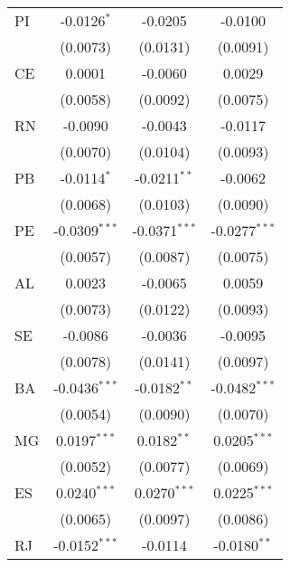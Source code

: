 \begin{tabular}{lccc}
   PI              & -0.0126$^{*}$           & -0.0205                 & -0.0100\\   
                   & (0.0073)                & (0.0131)                & (0.0091)\\   
   CE              & 0.0001                  & -0.0060                 & 0.0029\\   
                   & (0.0058)                & (0.0092)                & (0.0075)\\   
   RN              & -0.0090                 & -0.0043                 & -0.0117\\   
                   & (0.0070)                & (0.0104)                & (0.0093)\\   
   PB              & -0.0114$^{*}$           & -0.0211$^{**}$          & -0.0062\\   
                   & (0.0068)                & (0.0103)                & (0.0090)\\   
   PE              & -0.0309$^{***}$         & -0.0371$^{***}$         & -0.0277$^{***}$\\   
                   & (0.0057)                & (0.0087)                & (0.0075)\\   
   AL              & 0.0023                  & -0.0065                 & 0.0059\\   
                   & (0.0073)                & (0.0122)                & (0.0093)\\   
   SE              & -0.0086                 & -0.0036                 & -0.0095\\   
                   & (0.0078)                & (0.0141)                & (0.0097)\\   
   BA              & -0.0436$^{***}$         & -0.0182$^{**}$          & -0.0482$^{***}$\\   
                   & (0.0054)                & (0.0090)                & (0.0070)\\   
   MG              & 0.0197$^{***}$          & 0.0182$^{**}$           & 0.0205$^{***}$\\   
                   & (0.0052)                & (0.0077)                & (0.0069)\\   
   ES              & 0.0240$^{***}$          & 0.0270$^{***}$          & 0.0225$^{***}$\\   
                   & (0.0065)                & (0.0097)                & (0.0086)\\   
   RJ              & -0.0152$^{***}$         & -0.0114                 & -0.0180$^{**}$\\   

\end{tabular}
